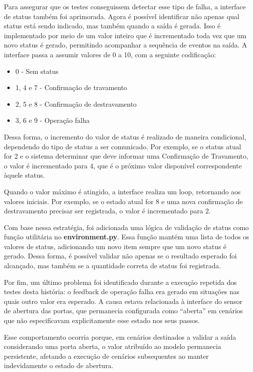 Para assegurar que os testes conseguissem detectar esse tipo de falha, a interface de status também foi aprimorada. Agora é possível identificar não apenas qual status 
está sendo indicado, mas também quando a saída é gerada. Isso é implementado por meio de um valor inteiro que é incrementado toda vez que um novo status é gerado, 
permitindo acompanhar a sequência de eventos na saída. A interface passa a assumir valores de 0 a 10, com a seguinte codificação:

\begin{itemize}
	\item 0 - Sem status
	\item 1, 4 e 7 - Confirmação de travamento
	\item 2, 5 e 8 - Confirmação de destravamento
	\item 3, 6 e 9 - Operação falha
\end{itemize}

Dessa forma, o incremento do valor de status é realizado de maneira condicional, dependendo do tipo de status a ser comunicado. Por exemplo, se o status atual 
for 2 e o sistema determinar que deve informar uma Confirmação de Travamento, o valor é incrementado para 4, que é o próximo valor disponível correspondente àquele status.

Quando o valor máximo é atingido, a interface realiza um loop, retornando aos valores iniciais. Por exemplo, se o estado atual for 8 e uma nova confirmação de 
destravamento precisar ser registrada, o valor é incrementado para 2.

Com base nessa estratégia, foi adicionada uma lógica de validação de status como função utilitária no \textbf{environment.py}. Essa função mantém uma lista de todos os valores 
de status, adicionando um novo item sempre que um novo status é gerado. Dessa forma, é possível validar não apenas se o resultado esperado foi alcançado, mas também se 
a quantidade correta de status foi registrada.

Por fim, um último problema foi identificado durante a execução repetida dos testes desta história: o feedback de operação falha era gerado em situações nas quais outro 
valor era esperado. A causa estava relacionada à interface do sensor de abertura das portas, que permanecia configurada como ``aberta'' em cenários que não especificavam 
explicitamente esse estado nos seus passos.

Esse comportamento ocorria porque, em cenários destinados a validar a saída considerando uma porta aberta, o valor atribuído ao modelo permanecia persistente, afetando 
a execução de cenários subsequentes ao manter indevidamente o estado de abertura.

